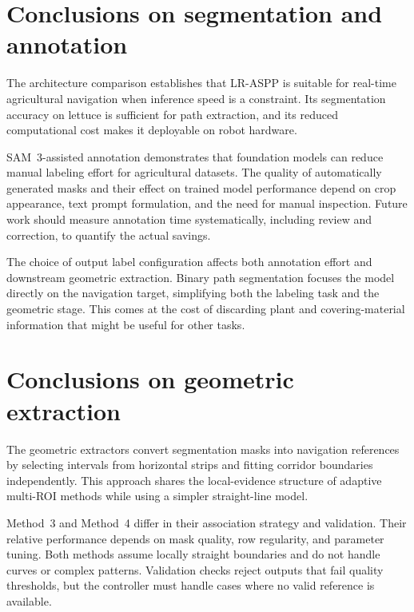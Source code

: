 \section{Conclusions on segmentation and annotation}
\label{sec:segmentation_conclusions}

The architecture comparison establishes that LR-ASPP is suitable for real-time agricultural navigation when inference speed is a constraint. Its segmentation accuracy on lettuce is sufficient for path extraction, and its reduced computational cost makes it deployable on robot hardware.

SAM~3-assisted annotation demonstrates that foundation models can reduce manual labeling effort for agricultural datasets. The quality of automatically generated masks and their effect on trained model performance depend on crop appearance, text prompt formulation, and the need for manual inspection. Future work should measure annotation time systematically, including review and correction, to quantify the actual savings.

The choice of output label configuration affects both annotation effort and downstream geometric extraction. Binary path segmentation focuses the model directly on the navigation target, simplifying both the labeling task and the geometric stage. This comes at the cost of discarding plant and covering-material information that might be useful for other tasks.

\section{Conclusions on geometric extraction}
\label{sec:geometric_conclusions}

The geometric extractors convert segmentation masks into navigation references by selecting intervals from horizontal strips and fitting corridor boundaries independently. This approach shares the local-evidence structure of adaptive multi-ROI methods while using a simpler straight-line model.

Method~3 and Method~4 differ in their association strategy and validation. Their relative performance depends on mask quality, row regularity, and parameter tuning. Both methods assume locally straight boundaries and do not handle curves or complex patterns. Validation checks reject outputs that fail quality thresholds, but the controller must handle cases where no valid reference is available.


